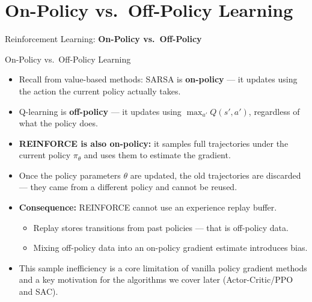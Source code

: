 \section{On-Policy vs.\ Off-Policy Learning}
\begin{frame}{}
    \LARGE Reinforcement Learning: \textbf{On-Policy vs.\ Off-Policy}
\end{frame}

\begin{frame}{On-Policy vs.\ Off-Policy Learning}
\begin{itemize}
    \item Recall from value-based methods: SARSA is \textbf{on-policy} --- it updates using the action the current policy actually takes.
    \item Q-learning is \textbf{off-policy} --- it updates using $\max_{a'} Q(s',a')$, regardless of what the policy does.
    \pause
    \item \textbf{REINFORCE is also on-policy:} it samples full trajectories under the current policy $\pi_\theta$ and uses them to estimate the gradient.
    \item Once the policy parameters $\theta$ are updated, the old trajectories are discarded --- they came from a different policy and cannot be reused.
    \pause
    \item \textbf{Consequence:} REINFORCE cannot use an experience replay buffer.
    \begin{itemize}
        \item Replay stores transitions from past policies --- that is off-policy data.
        \item Mixing off-policy data into an on-policy gradient estimate introduces bias.
    \end{itemize}
    \pause
    \item This sample inefficiency is a core limitation of vanilla policy gradient methods and a key motivation for the algorithms we cover later (Actor-Critic/PPO and SAC).
\end{itemize}
\end{frame}

